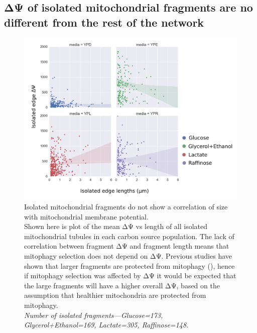 \subsection{ΔΨ of isolated mitochondrial fragments are no different from the rest of the network }
%
\begin{figure}[htp]
	\centering
    \hspace*{.5in}\includegraphics[width=.9\textwidth]{isoedges}
    \caption[Isolated mitochondrial fragments do not show a correlation of size with mitochondrial membrane potential]{Isolated mitochondrial fragments do not show a correlation of size with mitochondrial membrane potential.\\Shown here is plot of the mean ΔΨ vs length of all isolated mitochondrial tubules in each carbon source population. The lack of correlation between fragment ΔΨ and fragment length means that mitophagy selection does not depend on ΔΨ. Previous studies have shown that larger fragments are protected from mitophagy (\cite{rambold_tubular_2011}), hence if mitophagy selection was affected by ΔΨ it would be expected that the large fragments will have a higher overall ΔΨ, based on the assumption that healthier mitochondria are protected from mitophagy.\\\emph{Number of isolated fragments---Glucose=173, Glycerol+Ethanol=169, Lactate=305, Raffinose=148.}}\label{fig:isoedges}
\end{figure}
%
